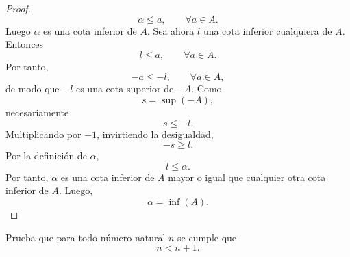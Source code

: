 \documentclass[12pt,a4paper]{article}
\begin{document}
\begin{proof}
\begin{equation*}
            \alpha\leq a,\qquad\forall a\in A.
        \end{equation*}
        Luego $\alpha$ es una cota inferior de $A$. Sea ahora $l$ una cota inferior cualquiera de $A$. Entonces
        \begin{equation*}
            l\leq a,\qquad\forall a\in A.
        \end{equation*}
        Por tanto,
        \begin{equation*}
            -a\leq-l,\qquad\forall a\in A,
        \end{equation*}
        de modo que $-l$ es una cota superior de $-A$. Como
        \begin{equation*}
            s=\sup(-A),
        \end{equation*}
        necesariamente
        \begin{equation*}
            s\leq-l.
        \end{equation*}
        Multiplicando por $-1$, invirtiendo la desigualdad,
        \begin{equation*}
            -s\geq l.
        \end{equation*}
        Por la definición de $\alpha$,
        \begin{equation*}
            l\leq\alpha.
        \end{equation*}
        Por tanto, $\alpha$ es una cota inferior de $A$ mayor o igual que cualquier otra cota inferior de $A$. Luego,
        \begin{equation*}
            \alpha=\inf(A).
        \end{equation*}
    \end{proof}

    \begin{problema}
        Prueba que para todo número natural $n$ se cumple que
        \begin{equation*}
            n\lt n+1.
        \end{equation*}
    \end{problema}
\end{document}
